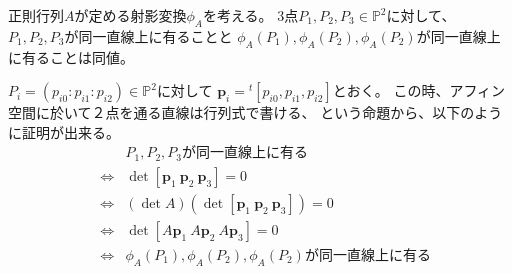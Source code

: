 \documentclass[a4]{article}
\newcommand{\proj}{\mathbb{P}}
\begin{document}
    \begin{Lemma}
        正則行列$A$が定める射影変換$\phi_A$を考える。
        3点$P_1, P_2, P_3 \in \proj^2$に対して、
        $P_1, P_2, P_3$が同一直線上に有ることと
        $\phi_A(P_1), \phi_A(P_2), \phi_A(P_2)$が同一直線上に有ることは同値。
    \end{Lemma}
    \begin{Proof}
        $P_i=(p_{i0}:p_{i1}:p_{i2}) \in \proj^2$に対して
        $\mathbf{p}_i={}^t[ p_{i0}, p_{i1}, p_{i2} ]$とおく。
        この時、アフィン空間に於いて２点を通る直線は行列式で書ける、
        という命題から、以下のように証明が出来る。
        \begin{eqnarray*}
            &{}&    \mbox{$P_1, P_2, P_3$が同一直線上に有る} \\
            &\iff&  \det[\mathbf{p}_1~\mathbf{p}_2~\mathbf{p}_3]=0 \\
            &\iff&  (\det A) (\det[\mathbf{p}_1~\mathbf{p}_2~\mathbf{p}_3])=0 \\
            &\iff&  \det[A\mathbf{p}_1~A\mathbf{p}_2~A\mathbf{p}_3]=0 \\
            &\iff&  \mbox{$\phi_A(P_1), \phi_A(P_2), \phi_A(P_2)$が同一直線上に有る} \\
        \end{eqnarray*}
        \QED
    \end{Proof}
\end{document}
